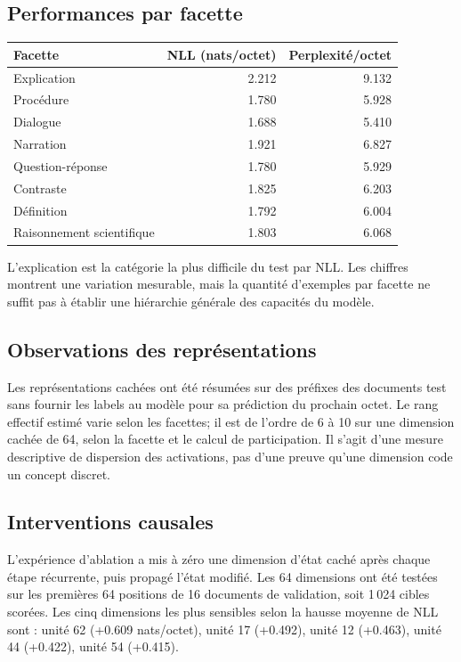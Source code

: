 \documentclass[11pt,a4paper]{article}
\begin{document}
\subsection{Performances par facette}
\begin{center}
\small
\begin{tabular}{lrr}
\toprule
Facette & NLL (nats/octet) & Perplexité/octet\\
\midrule
Explication & 2.212 & 9.132\\
Procédure & 1.780 & 5.928\\
Dialogue & 1.688 & 5.410\\
Narration & 1.921 & 6.827\\
Question-réponse & 1.780 & 5.929\\
Contraste & 1.825 & 6.203\\
Définition & 1.792 & 6.004\\
Raisonnement scientifique & 1.803 & 6.068\\
\bottomrule
\end{tabular}
\end{center}
L'explication est la catégorie la plus difficile du test par NLL. Les chiffres montrent une variation mesurable, mais la quantité d'exemples par facette ne suffit pas à établir une hiérarchie générale des capacités du modèle.

\subsection{Observations des représentations}
Les représentations cachées ont été résumées sur des préfixes des documents test sans fournir les labels au modèle pour sa prédiction du prochain octet. Le rang effectif estimé varie selon les facettes; il est de l'ordre de 6 à 10 sur une dimension cachée de 64, selon la facette et le calcul de participation. Il s'agit d'une mesure descriptive de dispersion des activations, pas d'une preuve qu'une dimension code un concept discret.

\subsection{Interventions causales}
L'expérience d'ablation a mis à zéro une dimension d'état caché après chaque étape récurrente, puis propagé l'état modifié. Les 64 dimensions ont été testées sur les premières 64 positions de 16 documents de validation, soit 1\,024 cibles scorées. Les cinq dimensions les plus sensibles selon la hausse moyenne de NLL sont : unité 62 (+0.609 nats/octet), unité 17 (+0.492), unité 12 (+0.463), unité 44 (+0.422), unité 54 (+0.415).
\end{document}
